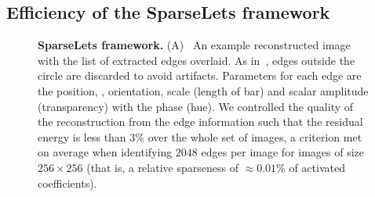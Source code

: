 \documentclass[a4paper, 11pt]{book}
\begin{document}
\subsection{Efficiency of the SparseLets framework}
\begin{figure}[ht!]%
\caption{ {\bf SparseLets framework.} \textsf{(A)}~ An example reconstructed image with the list of extracted edges overlaid.
As in~\citet{Geisler01}, edges outside the circle are discarded to avoid artifacts.
Parameters for each edge are the position, , orientation, scale (length of bar) and scalar amplitude (transparency) with the phase (hue).
We controlled the quality of the reconstruction from the edge information such
that the residual energy is less than $3\%$ over the whole set of images,
a criterion met on average when identifying $2048$ edges per image for images of size $256\times 256$ (that is, a relative sparseness of $\approx 0.01\%$ of activated coefficients).
}
\end{figure}
\end{document}
